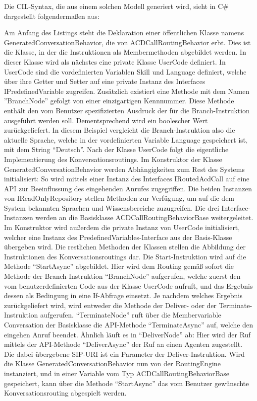 Die CIL-Syntax, die aus einem solchen Modell generiert wird, sieht in C\# dargestellt folgendermaßen aus:
\newpage



Am Anfang des Listings steht die Deklaration einer öffentlichen Klasse namens GeneratedConversationBehavior, die von ACDCallRoutingBehavior erbt. Dies ist die Klasse, in der die Instruktionen als Membermethoden abgebildet werden. In dieser Klasse wird als nächstes eine private Klasse UserCode definiert. In UserCode sind die vordefinierten Variablen Skill und Language definiert, welche über ihre Getter und Setter auf eine private Instanz des Interfaces IPredefinedVariable zugreifen. Zusätzlich existiert eine Methode mit dem Namen ''BranchNode'' gefolgt von einer einzigartigen Kennnummer. Diese Methode enthält den vom Benutzer spezifizierten Ausdruck der für die Branch-Instruktion ausgeführt werden soll. Dementsprechend wird ein boolescher Wert zurückgeliefert. In diesem Beispiel vergleicht die Branch-Instruktion also die aktuelle Sprache, welche in der vordefinierten Variable Language gespeichert ist, mit dem String ``Deutsch''. 
\newline
Nach der Klasse UserCode folgt die eigentliche Implementierung des Konversationsroutings. Im Konstruktor der Klasse GeneratedConversationBehavior werden Abhängigkeiten zum Rest des Systems initialisiert: So wird mittels einer Instanz des Interfaces IRoutedAcdCall auf eine API zur Beeinflussung des eingehenden Anrufes zugegriffen. Die beiden Instanzen von IReadOnlyRepository stellen Methoden zur Verfügung, um auf die dem System bekannten Sprachen und Wissensbereiche zuzugreifen. Die drei Interface-Instanzen werden an die Basisklasse ACDCallRoutingBehaviorBase weitergeleitet. Im Konstruktor wird außerdem die private Instanz von UserCode initialisiert, welcher eine Instanz des PredefinedVariables-Interface aus der Basis-Klasse übergeben wird. Die restlichen Methoden der Klassen stellen die Abbildung der Instruktionen des Konversationsroutings dar. Die Start-Instruktion wird auf die Methode ``StartAsync'' abgebildet. Hier wird dem Routing gemäß sofort die Methode der Branch-Instruktion ``BranchNode'' aufgerufen, welche zuerst den vom benutzerdefinierten Code aus der Klasse UserCode aufruft, und das Ergebnis dessen als Bedingung in eine If-Abfrage einsetzt. Je nachdem welches Ergebnis zurückgeliefert wird, wird entweder die Methode der Deliver- oder der Terminate-Instruktion aufgerufen. ``TerminateNode'' ruft über die Membervariable Conversation der Basisklasse die API-Methode ``TerminateAsync'' auf, welche den eingehen Anruf beendet. Ähnlich läuft es in ``DeliverNode'' ab: Hier wird der Ruf mittels der API-Methode ``DeliverAsync'' der Ruf an einen Agenten zugestellt. Die dabei übergebene SIP-URI ist ein Parameter der Deliver-Instruktion.
\newline
Wird die Klasse GeneratedConversationBehavior nun von der RoutingEngine instanziert, und in einer Variable vom Typ ACDCallRoutingBehaviorBase gespeichert, kann über die Methode ``StartAsync'' das vom Benutzer gewünschte Konversationsrouting abgespielt werden.

